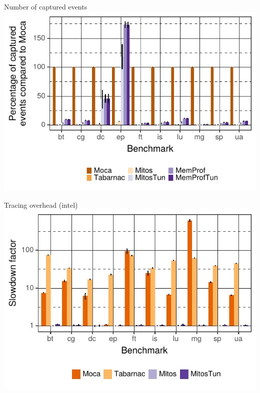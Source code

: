 \documentclass[xcolor={usenames,dvipsnames},hyperref={pdfusetitle}]{beamer}
\begin{document}
\begin{frame}{Number of captured events}
        \includegraphics[width=\linewidth]{moca/slides/moca_addr_intel.pdf}
\end{frame}

\begin{frame}{Tracing overhead (intel)}
        \includegraphics[width=\linewidth]{moca/slides/moca_overhead_intel.pdf}
\end{frame}
\end{document}
